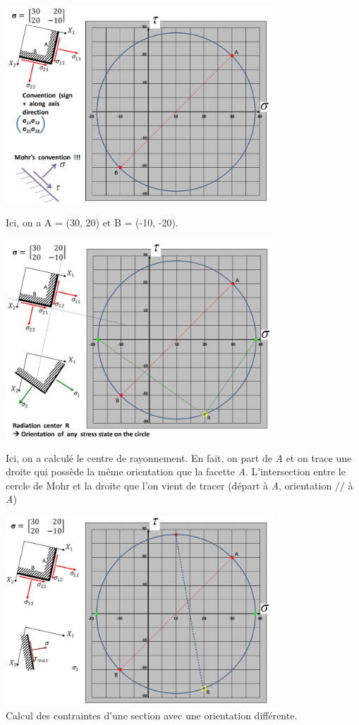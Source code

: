 \documentclass[a4paper]{article}
\begin{document}
\begin{center}
\includegraphics[width=0.75\textwidth]{images/Ex1.PNG}
\end{center}
Ici, on a A = (30, 20) et B = (-10, -20).
\begin{center}
\includegraphics[width=0.75\textwidth]{images/Ex3.PNG}
\end{center}
Ici, on a calculé le centre de rayonnement. En fait, on part de \emph{A} et on trace une droite qui possède la même orientation que la facette \emph{A}. L'intersection entre le cercle de Mohr et la droite que l'on vient de tracer (départ à \emph{A}, orientation $ // $ à \emph{A})
\begin{center}
\includegraphics[width=0.75\textwidth]{images/Ex6.PNG} \\
Calcul des contraintes d'une section avec une orientation différente.
\end{center}
\end{document}
